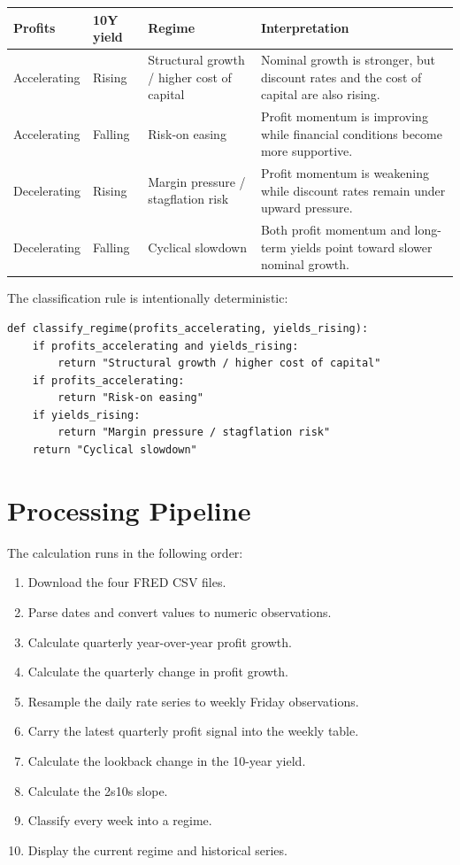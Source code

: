 \documentclass[11pt]{article}
\begin{document}
\begin{longtable}{p{}p{}p{}p{}}
\toprule
\textbf{Profits} & \textbf{10Y yield} & \textbf{Regime} &
\textbf{Interpretation} \\
\midrule
\endhead
Accelerating & Rising &
Structural growth / higher cost of capital &
Nominal growth is stronger, but discount rates and the cost of capital are
also rising. \\
Accelerating & Falling &
Risk-on easing &
Profit momentum is improving while financial conditions become more
supportive. \\
Decelerating & Rising &
Margin pressure / stagflation risk &
Profit momentum is weakening while discount rates remain under upward
pressure. \\
Decelerating & Falling &
Cyclical slowdown &
Both profit momentum and long-term yields point toward slower nominal growth. \\
\bottomrule
\end{longtable}

The classification rule is intentionally deterministic:

\begin{lstlisting}[style=code]
def classify_regime(profits_accelerating, yields_rising):
    if profits_accelerating and yields_rising:
        return "Structural growth / higher cost of capital"
    if profits_accelerating:
        return "Risk-on easing"
    if yields_rising:
        return "Margin pressure / stagflation risk"
    return "Cyclical slowdown"
\end{lstlisting}

\section{Processing Pipeline}

The calculation runs in the following order:

\begin{enumerate}
  \item Download the four FRED CSV files.
  \item Parse dates and convert values to numeric observations.
  \item Calculate quarterly year-over-year profit growth.
  \item Calculate the quarterly change in profit growth.
  \item Resample the daily rate series to weekly Friday observations.
  \item Carry the latest quarterly profit signal into the weekly table.
  \item Calculate the lookback change in the 10-year yield.
  \item Calculate the 2s10s slope.
  \item Classify every week into a regime.
  \item Display the current regime and historical series.
\end{enumerate}
\end{document}
